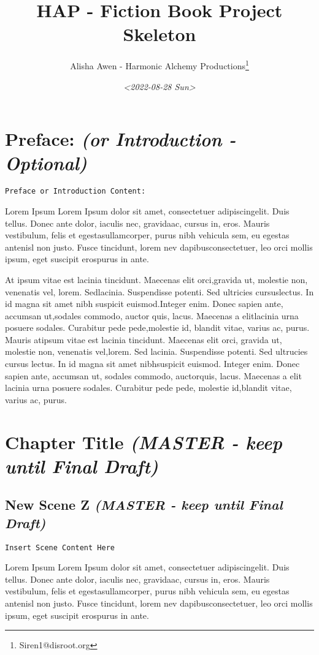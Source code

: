 \documentclass[openleft,oneside,showtrims]{memoir}
\author{Alisha Awen - Harmonic Alchemy Productions\thanks{Siren1@disroot.org}}
\date{\textit{<2022-08-28 Sun>}}
\title{HAP - Fiction Book Project Skeleton}
\begin{document}
\maketitle
\chapter{Preface: \emph{(or Introduction - Optional)}}
\label{sec:orgc501254}
\label{BOOK_PREFACE}
\texttt{Preface or Introduction Content:} 

Lorem Ipsum Lorem Ipsum dolor sit amet, consectetuer adipiscingelit. Duis tellus. Donec ante dolor, iaculis nec, gravidaac, cursus in, eros. Mauris vestibulum, felis et egestasullamcorper, purus nibh vehicula sem, eu egestas antenisl non justo. Fusce tincidunt, lorem nev dapibusconsectetuer, leo orci mollis ipsum, eget suscipit erospurus in ante.

At ipsum vitae est lacinia tincidunt. Maecenas elit orci,gravida ut, molestie non, venenatis vel, lorem. Sedlacinia. Suspendisse potenti. Sed ultricies cursuslectus. In id magna sit amet nibh suspicit euismod.Integer enim. Donec sapien ante, accumsan ut,sodales commodo, auctor quis, lacus. Maecenas a elitlacinia urna posuere sodales. Curabitur pede pede,molestie id, blandit vitae, varius ac, purus. Mauris atipsum vitae est lacinia tincidunt. Maecenas elit orci, gravida ut, molestie non, venenatis vel,lorem. Sed lacinia. Suspendisse potenti. Sed ultrucies cursus lectus. In id magna sit amet nibhsuspicit euismod. Integer enim. Donec sapien ante, accumsan ut, sodales commodo, auctorquis, lacus. Maecenas a elit lacinia urna posuere sodales. Curabitur pede pede, molestie id,blandit vitae, varius ac, purus.



\mainmatter

\chapter{Chapter Title \emph{(MASTER - keep until Final Draft)}}
\label{sec:org10cc77c}
\label{CHAPTER_chapter-title}
\section*{New Scene Z \emph{(MASTER - keep until Final Draft)}}
\label{sec:org52a94a2}
\label{SCENE_new-scene-z}
\texttt{Insert Scene Content Here}

Lorem Ipsum Lorem Ipsum dolor sit amet, consectetuer adipiscingelit. Duis tellus. Donec ante dolor, iaculis nec, gravidaac, cursus in, eros. Mauris vestibulum, felis et egestasullamcorper, purus nibh vehicula sem, eu egestas antenisl non justo. Fusce tincidunt, lorem nev dapibusconsectetuer, leo orci mollis ipsum, eget suscipit erospurus in ante.
\end{document}
